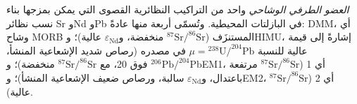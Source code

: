 \begin{definition}\label{def:b2:isotope-geochemistry:end-members}
\emph{العضو الطرفي الوشاحي} واحد من التراكيب
النظائرية القصوى التي يمكن بمزجها بناء نسب نظائر Sr وNd وPb في البازلتات
المحيطية. وتُسمّى أربعة منها عادةً: DMM، أي وشاح MORB
المستنزَف ($^{87}\mathrm{Sr}/^{86}\mathrm{Sr}$ منخفضة، و$\varepsilon_{\mathrm{Nd}}$ عالية)؛
وHIMU، إشارةً إلى قيمة عالية للنسبة $\mu = {}^{238}\mathrm{U}/^{204}\mathrm{Pb}$ في مصدره
(رصاص شديد الإشعاعية المنشأ، $^{206}\mathrm{Pb}/^{204}\mathrm{Pb}$ فوق 20، مع
$^{87}\mathrm{Sr}/^{86}\mathrm{Sr}$ منخفضة)؛ وEM1، أي  1
($^{87}\mathrm{Sr}/^{86}\mathrm{Sr}$ مرتفعة باعتدال، و$\varepsilon_{\mathrm{Nd}}$ سالبة، ورصاص
ضعيف الإشعاعية المنشأ)؛ وEM2، أي  2 ($^{87}\mathrm{Sr}/^{86}\mathrm{Sr}$ عالية).
\end{definition}

